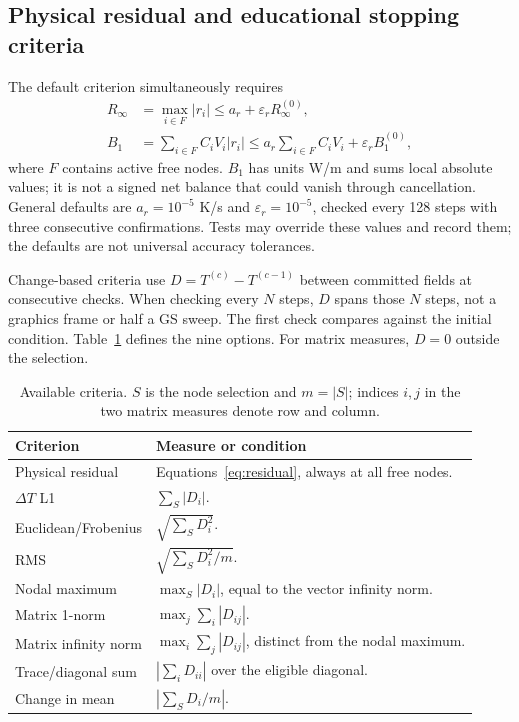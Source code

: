 \documentclass[11pt,a4paper]{article}
\begin{document}
\subsection{Physical residual and educational stopping criteria}
The default criterion simultaneously requires
\begin{align}
 R_\infty&=\max_{i\in F}|r_i|\leq a_r+\varepsilon_rR_\infty^{(0)},\\
 B_1&=\sum_{i\in F}C_iV_i|r_i|\leq a_r\sum_{i\in F}C_iV_i+\varepsilon_rB_1^{(0)},
 \label{eq:residual}
\end{align}
where $F$ contains active free nodes. $B_1$ has units W/m and sums local absolute values; it is not a signed net balance that could vanish through cancellation. General defaults are $a_r=10^{-5}$ K/s and $\varepsilon_r=10^{-5}$, checked every 128 steps with three consecutive confirmations. Tests may override these values and record them; the defaults are not universal accuracy tolerances.

Change-based criteria use $D=T^{(c)}-T^{(c-1)}$ between committed fields at consecutive checks. When checking every $N$ steps, $D$ spans those $N$ steps, not a graphics frame or half a GS sweep. The first check compares against the initial condition. Table~\ref{tab:criteria} defines the nine options. For matrix measures, $D=0$ outside the selection.

\begin{table}[tbp]\centering\small
\caption{Available criteria. $S$ is the node selection and $m=|S|$; indices $i,j$ in the two matrix measures denote row and column.}\label{tab:criteria}
\begin{tabularx}{\linewidth}{@{}lX@{}}\toprule
Criterion & Measure or condition\\\midrule
Physical residual & Equations~\eqref{eq:residual}, always at all free nodes.\\
$\Delta T$ L1 & $\sum_S|D_i|$.\\
Euclidean/Frobenius & $\sqrt{\sum_SD_i^2}$.\\
RMS & $\sqrt{\sum_SD_i^2/m}$.\\
Nodal maximum & $\max_S|D_i|$, equal to the vector infinity norm.\\
Matrix 1-norm & $\max_j\sum_i|D_{ij}|$.\\
Matrix infinity norm & $\max_i\sum_j|D_{ij}|$, distinct from the nodal maximum.\\
Trace/diagonal sum & $|\sum_iD_{ii}|$ over the eligible diagonal.\\
Change in mean & $|\sum_SD_i/m|$.\\\bottomrule
\end{tabularx}
\end{table}
\end{document}
